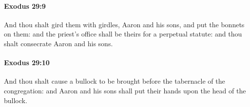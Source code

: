 		\paragraph{Exodus 29:9} %
			\label{EXODUS-29-9}

			And thou shalt gird them with girdles, Aaron and his sons, and put the bonnets on them: and the priest's office shall be theirs for a perpetual statute: and thou shalt consecrate Aaron and his sons.


		\paragraph{Exodus 29:10} %
			\label{EXODUS-29-10}

			And thou shalt cause a bullock to be brought before the tabernacle of the congregation: and Aaron and his sons shall put their hands upon the head of the bullock.


